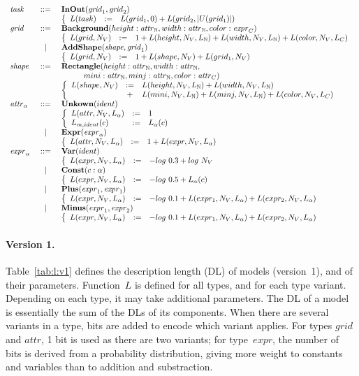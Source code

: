 \documentclass[a4paper]{llncs}
\newenvironment{datatype}{$\begin{array}{lcl}}{\end{array}$}
\newcommand{\is}{&\ ::=\ &}
\newcommand{\altis}{\\ &\ \mid\ &}
\newcommand{\baction}{\\ & & \left\{\begin{array}{lcl}}
\newcommand{\eaction}{\end{array}\right.}
\newcommand{\defby}{& := &}
\newcommand{\nat}{\mathbb{N}}
\begin{document}
{\begin{table}[t]
\caption{Definition of the description length of models and their parameters}
\begin{center}
\begin{datatype}
  {\it task} \is {\bf InOut}({\it grid}_1, {\it grid}_2)
  \baction
  L(task) \defby L(grid_1,0) + L(grid_2,|U(grid_1)|)
  \eaction
  \\
  {\it grid} \is {\bf Background}(height: {\it attr}_\nat, width: {\it attr}_\nat, color: {\it expr}_C)
  \baction
  L(grid,N_V) \defby 1 + L(height,N_V,L_\nat) + L(width,N_V,L_\nat) + L(color,N_V,L_C)
  \eaction
  \altis {\bf AddShape}({\it shape}, {\it grid}_1)
  \baction
  L(grid,N_V) \defby 1 + L(shape,N_V) + L(grid_1,N_V)
  \eaction
  \\
  {\it shape} \is {\bf Rectangle}(height: {\it attr}_\nat, width: {\it attr}_\nat,\\
  & & \hspace*{1cm} mini: {\it attr}_\nat, minj: {\it attr}_\nat, color: {\it attr}_C)
  \baction
  L(shape,N_V) \defby L(height,N_V,L_\nat) + L(width,N_V,L_\nat) \\
  & + & L(mini,N_V,L_\nat) + L(minj,N_V,L_\nat) + L(color,N_V,L_C)
  \eaction
  \\
  {\it attr}_\alpha \is {\bf Unkown}(ident)
  \baction
  L(attr,N_V,L_\alpha) \defby 1 \\
  L_{m,ident}(c) \defby L_\alpha(c)
  \eaction
  \altis {\bf Expr}({\it expr}_\alpha)
  \baction
  L(attr,N_V,L_\alpha) \defby 1 + L(expr,N_V,L_\alpha)
  \eaction
  \\
  {\it expr}_\alpha \is {\bf Var}(ident)
  \baction
  L(expr,N_V,L_\alpha) \defby -log\ 0.3 + log\ N_V
  \eaction
  \altis {\bf Const}(c: \alpha)
  \baction
  L(expr,N_V,L_\alpha) \defby -log\ 0.5 + L_\alpha(c)
  \eaction
  \altis {\bf Plus}({\it expr}_1, {\it expr}_1)
  \baction
  L(expr,N_V,L_\alpha) \defby -log\ 0.1 + L(expr_1,N_V,L_\alpha) + L(expr_2,N_V,L_\alpha)
  \eaction
  \altis {\bf Minus}({\it expr}_1, {\it expr}_2)
  \baction
  L(expr,N_V,L_\alpha) \defby -log\ 0.1 + L(expr_1,N_V,L_\alpha) + L(expr_2,N_V,L_\alpha)
  \eaction
\end{datatype}
\end{center}
\label{tab:l:v1}
\end{table}

\paragraph{Version 1.} Table~\ref{tab:l:v1} defines the description
length (DL) of models (version~1), and of their
parameters. Function~$L$ is defined for all types, and for each type
variant. Depending on each type, it may take additional
parameters. The DL of a model is essentially the sum of the DLs of its
components. When there are several variants in a type, bits are added
to encode which variant applies. For types $grid$ and $attr$, 1 bit is
used as there are two variants; for type~$expr$, the number of bits is
derived from a probability distribution, giving more weight to
constants and variables than to addition and substraction.

}
\end{document}

